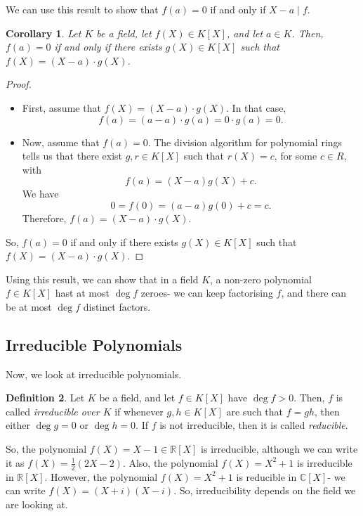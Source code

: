 \documentclass[a4paper, openany]{memoir}
\theoremstyle{definition}
\newtheorem{definition}{Definition}[section]
\theoremstyle{plain}
\newtheorem{corollary}[definition]{Corollary}
\begin{document}
We can use this result to show that $f(a) = 0$ if and only if $X - a \mid f$.
\begin{corollary}
Let $K$ be a field, let $f(X) \in K[X]$, and let $a \in K$. Then, $f(a) = 0$ if and only if there exists $g(X) \in K[X]$ such that $f(X) = (X - a) \cdot g(X)$.
\end{corollary}
\begin{proof}
\hspace*{0pt}
\begin{itemize}
    \item First, assume that $f(X) = (X - a) \cdot g(X)$. In that case,
    \[f(a) = (a - a) \cdot g(a) = 0 \cdot g(a) = 0.\]
    
    \item Now, assume that $f(a) = 0$. The division algorithm for polynomial rings tells us that there exist $g, r \in K[X]$ such that $r(X) = c$, for some $c \in R$, with
    \[f(a) = (X - a)g(X) + c.\]
    We have
    \[0 = f(0) = (a - a) g(0) + c = c.\]
    Therefore, $f(a) = (X - a) \cdot g(X)$.
\end{itemize}
So, $f(a) = 0$ if and only if there exists $g(X) \in K[X]$ such that $f(X) = (X - a) \cdot g(X)$.
\end{proof}
\noindent Using this result, we can show that in a field $K$, a non-zero polynomial $f \in K[X]$ hast at most $\deg f$ zeroes- we can keep factorising $f$, and there can be at most $\deg f$ distinct factors.

\subsection{Irreducible Polynomials}
Now, we look at irreducible polynomials.
\begin{definition}
Let $K$ be a field, and let $f \in K[X]$ have $\deg f > 0$. Then, $f$ is called \emph{irreducible over $K$} if whenever $g, h \in K[X]$ are such that $f = gh$, then either $\deg g = 0$ or $\deg h = 0$. If $f$ is not irreducible, then it is called \emph{reducible}.
\end{definition}
\noindent So, the polynomial $f(X) = X-1 \in \mathbb{R}[X]$ is irreducible, although we can write it as $f(X) = \frac{1}{2}(2X - 2)$. Also, the polynomial $f(X) = X^2 + 1$ is irreducible in $\mathbb{R}[X]$. However, the polynomial $f(X) = X^2 + 1$ is reducible in $\mathbb{C}[X]$- we can write $f(X) = (X + i)(X - i)$. So, irreducibility depends on the field we are looking at.
\end{document}

